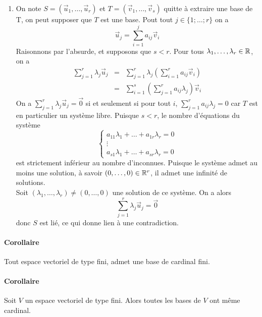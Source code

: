 {\begin{enumerate}
    \item On note $S = (\vec{u}_1, \ldots, \vec{u}_r)$ et $T = (\vec{v}_1, \ldots, \vec{v}_s)$ quitte à extraire une base de T, on peut supposer que $T$ est une base. Pout tout $j \in \{1; \ldots ; r\}$ on a
      $$\vec{u}_j = \sum_{i=1}^{j} {a_{ij} \vec{v}_i}$$
      Raisonnons par l'absurde, et supposons que $s < r$. Pour tous $\lambda_1, \ldots, \lambda_r \in \mathbb{R}$, on a
      \begin{eqnarray*}
        \sum_{j=1}^r { \lambda_j \vec{u}_j} &=& \sum_{j=1}^r {\lambda_j \left( \sum_{i=1}^r {a_{ij}\vec{v}_i} \right)} \\
          &=& \sum_{i=1}^s {\left( \sum_{j=1}^r {a_{ij}\lambda_j} \right) \vec{v}_i }
      \end{eqnarray*}
      On a $\sum_{j=1}^r {\lambda_j \vec{u}_j } = \vec{0}$ si et seulement si pour tout $i$, $\sum_{j=1}^r {a_{ij} \lambda_j } = 0$ car $T$ est en particulier un système libre. Puisque $s < r$, le nombre d'équations du système
      $$ \left\{ \begin{matrix}
        a_{11} \lambda_1 + \ldots + a_{1r} \lambda_r = 0 \\
        \vdots \\
        a_{s1} \lambda_1 + \ldots + a_{sr} \lambda_r = 0
      \end{matrix} \right. $$
      est strictement inférieur au nombre d'inconnues. Puisque le système admet au moins une solution, à savoir $(0, \ldots, 0) \in \mathbb{R}^r$, il admet une infinité de solutions. \\
      Soit $(\lambda_1, \ldots, \lambda_r) \neq (0, \ldots, 0)$ une solution de ce système. On a alors
      $$\sum_{j=1}^r {\lambda_j \vec{u}_j } = \vec{0}$$
      donc $S$ est lié, ce qui donne lien à une contradiction.
  \end{enumerate}
}

\paragraph{Corollaire} Tout espace vectoriel de type fini, admet une base de cardinal fini.

\paragraph{Corollaire} Soit $V$ un espace vectoriel de type fini. Alors toutes les bases de $V$ ont même cardinal.

